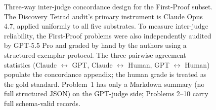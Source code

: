 \begin{figure}[t]
\begin{tikzpicture}
\end{tikzpicture}
\caption{Three-way inter-judge concordance design for the First-Proof subset.
The Discovery Tetrad audit's primary instrument is Claude Opus 4.7, applied
uniformly to all five substrates. To measure inter-judge reliability, the
First-Proof problems were also independently audited by GPT-5.5 Pro and
graded by hand by the authors using a structured exemplar protocol. The
three pairwise agreement statistics (Claude $\leftrightarrow$ GPT,
Claude $\leftrightarrow$ Human, GPT $\leftrightarrow$ Human) populate the
concordance appendix; the human grade is treated as the gold standard.
Problem~1 has only a Markdown summary (no full structured JSON) on the
GPT-judge side; Problems 2--10 carry full schema-valid records.}
\label{fig:concordance}
\end{figure}
